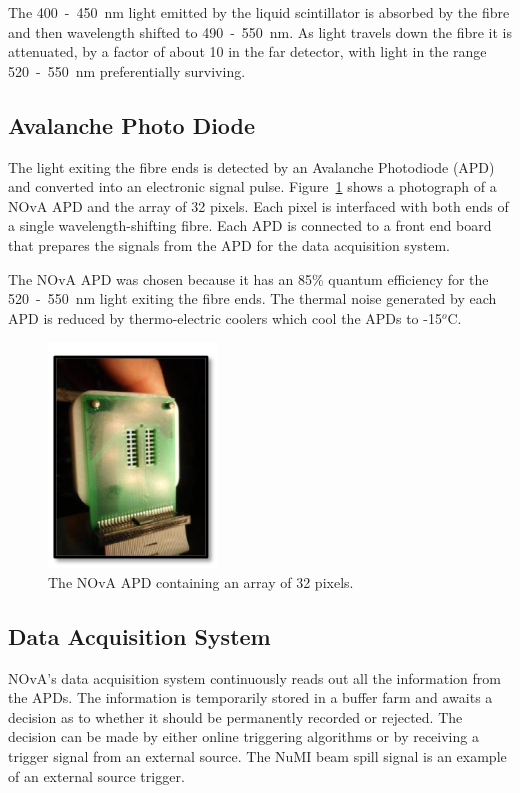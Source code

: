 The 400~-~450~nm light emitted by the liquid scintillator is absorbed
by the fibre and then wavelength shifted to 490~-~550~nm. 
As light travels down the fibre it is attenuated, by a factor of about
10 in the far detector, with light in the range 520~-~550~nm
preferentially surviving. 


\subsection{Avalanche Photo Diode}

The light exiting the fibre ends is detected by an Avalanche
Photodiode (APD) and converted into an
electronic signal pulse. 
Figure~\ref{fig:apd} shows a photograph of a NOvA APD
and the array
of 32 pixels. Each pixel is interfaced with both ends of a single
wavelength-shifting fibre. Each APD is connected to a front end board
that prepares the signals from the APD for the data acquisition
system. 

The NOvA APD was chosen because it has an 85\% quantum efficiency for
the 520~-~550~nm light exiting the fibre ends. 
The thermal noise generated by each APD is reduced by thermo-electric
coolers which cool the APDs to -15$^o$C. 


\begin{figure}
  \centering
  \includegraphics[width=0.4\textwidth]{../../img/det/gen/APD.png}
  \caption{The NOvA APD containing an array of 32 pixels.}
  \label{fig:apd}
\end{figure}





\subsection{Data Acquisition System}

NOvA's data acquisition system continuously reads out all
the information from the APDs. The information is temporarily stored
in a buffer farm and awaits a decision as to whether it should be
permanently recorded or rejected. The decision can be made by either
online triggering algorithms or by receiving a trigger signal from an
external source. The NuMI beam spill signal is an example of an
external source trigger.


